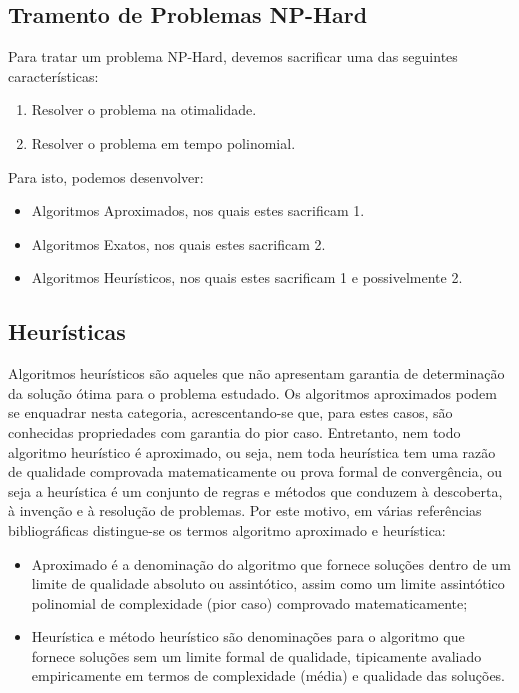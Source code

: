 \documentclass[a4paper, 12pt]{article}
\begin{document}

\subsection{Tramento de Problemas NP-Hard} \label{nphard}

Para tratar um problema NP-Hard, devemos sacrificar uma das seguintes características:
\begin{enumerate}
    \item Resolver o problema na otimalidade.
    \item Resolver o problema em tempo polinomial.
\end{enumerate}
Para isto, podemos desenvolver:
\begin{itemize}
    \item Algoritmos Aproximados, nos quais estes sacrificam 1.
    \item Algoritmos Exatos, nos quais estes sacrificam 2.
    \item Algoritmos Heurísticos, nos quais estes sacrificam 1 e possivelmente 2.
\end{itemize}

\subsection{Heurísticas}

Algoritmos heurísticos são aqueles que não apresentam garantia de determinação da solução ótima para o 
problema estudado. Os algoritmos aproximados podem se enquadrar nesta categoria, acrescentando-se que, para 
estes casos, são conhecidas propriedades com garantia do pior caso.  Entretanto, nem todo algoritmo heurístico 
é aproximado, ou seja, nem toda heurística tem uma razão de qualidade comprovada matematicamente ou prova 
formal de convergência, ou seja a heurística é um conjunto de regras e métodos que conduzem à descoberta, à 
invenção e à resolução de problemas. Por este motivo, em várias referências bibliográficas distingue-se os 
termos algoritmo aproximado e heurística:
\begin{itemize}
    \item Aproximado é a denominação do algoritmo que fornece soluções dentro de um limite de qualidade absoluto ou assintótico, assim como um limite assintótico polinomial de complexidade (pior caso) comprovado matematicamente;
    \item Heurística e método heurístico são denominações para o algoritmo que fornece soluções sem um limite formal de qualidade, tipicamente avaliado empiricamente em termos de complexidade (média) e qualidade das soluções.
\end{itemize}
\end{document}
